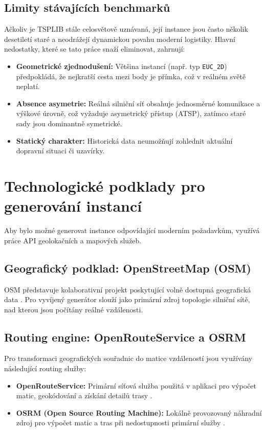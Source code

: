 \subsection{Limity stávajících benchmarků}
Ačkoliv je TSPLIB stále celosvětově uznávaná, její instance jsou často několik desetiletí staré a neodrážejí dynamickou povahu moderní logistiky. Hlavní nedostatky, které se tato práce snaží eliminovat, zahrnují:
\begin{itemize}
    \item \textbf{Geometrické zjednodušení:} Většina instancí (např. typ \texttt{EUC\_2D}) předpokládá, že nejkratší cesta mezi body je přímka, což v reálném světě neplatí.
    \item \textbf{Absence asymetrie:} Reálná silniční síť obsahuje jednosměrné komunikace a výškové úrovně, což vyžaduje asymetrický přístup (ATSP), zatímco staré sady jsou dominantně symetrické.
    \item \textbf{Statický charakter:} Historická data neumožňují zohlednit aktuální dopravní situaci či uzavírky.
\end{itemize}

\section{Technologické podklady pro generování instancí}
Aby bylo možné generovat instance odpovídající moderním požadavkům, využívá práce API geolokačních a mapových služeb.

\subsection{Geografický podklad: OpenStreetMap (OSM)}
OSM představuje kolaborativní projekt poskytující volně dostupná geografická data \cite{osm}. Pro vyvíjený generátor slouží jako primární zdroj topologie silniční sítě, nad kterou jsou počítány reálné vzdálenosti.

\subsection{Routing engine: OpenRouteService a OSRM}
Pro transformaci geografických souřadnic do matice vzdáleností jsou využívány následující routing služby:
\begin{itemize}
    \item \textbf{OpenRouteService:} Primární síťová služba použitá v aplikaci pro výpočet matic, geokódování a získání detailů trasy \cite{ors_matrix_docs}.
    \item \textbf{OSRM (Open Source Routing Machine):} Lokálně provozovaný náhradní zdroj pro výpočet matic a tras při nedostupnosti primární služby \cite{osrm_backend_readme,luxen2011osrm}.
\end{itemize}

